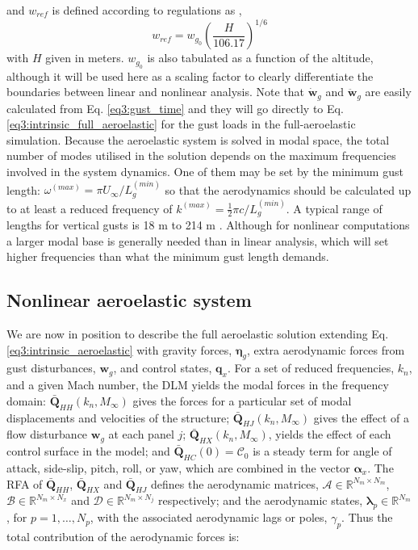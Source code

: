 \documentclass[11pt]{article}
\begin{document}
and $w_{ref}$ is defined according to regulations as \cite{Wright2007},
\begin{equation}\label{eq3:gust_scale}
w_{ref} = w_{g_0}\left(\frac{H}{106.17}\right)^{1/6}
\end{equation}
with $H$ given in meters. $w_{g_0}$ is also tabulated as a function of the altitude, although it will be used here as a scaling factor to clearly differentiate the boundaries between linear and nonlinear analysis. Note that $\dot{\bm{w}}_g$ and $\ddot{\bm{w}}_g$ are easily calculated from Eq. \eqref{eq3:gust_time} and they will go directly to Eq. \eqref{eq3:intrinsic_full_aeroelastic} for the gust loads in the full-aeroelastic simulation. Because the aeroelastic system is solved in modal space, the total number of modes utilised in the solution depends on the maximum frequencies involved in the system dynamics.  One of them may be set by  the minimum gust length: $\omega^{(max)} = \pi U_{\infty}/L_g^{(min)}$  so that the aerodynamics should be calculated up to at least a reduced frequency of $k^{(max)} = \tfrac12 \pi c/L_{g}^{(min)}$. A typical range of lengths for vertical gusts is 18 m to 214 m \cite{Wright2007}. Although for nonlinear computations a larger modal base is generally needed than in linear analysis, which will set higher frequencies than what the minimum gust length demands. 


\subsection{Nonlinear aeroelastic system}
\label{sec:orgf3f3512}

We are now in position to describe the full aeroelastic solution extending Eq.  \eqref{eq3:intrinsic_aeroelastic} with gravity forces, $\bm{\eta}_g$, extra aerodynamic forces from gust disturbances, $\bm{w}_g$, and control states, $\bm{q}_x$. For a set of reduced frequencies, $k_n$, and a given Mach number, the DLM yields  the modal forces in the frequency domain: $\bar{\bm{Q}}_{HH}(k_n,M_\infty)$ gives the forces for a particular set of modal displacements and velocities of the structure;  $\bar{\bm{Q}}_{HJ}(k_n,M_\infty)$ gives the effect of a flow disturbance $\bm{w}_g$ at each panel $j$; $\bar{\bm{Q}}_{HX}(k_n,M_\infty)$, yields the effect of each control surface in the model; and $\bar{\bm{Q}}_{HC}(0) = \pmb{\mathcal{C}}_0$ is a steady term for angle of attack, side-slip, pitch, roll, or yaw, which are combined in the vector $\bm{\alpha}_x$. The RFA of $\bar{\bm{Q}}_{HH}$, $\bar{\bm{Q}}_{HX}$ and $\bar{\bm{Q}}_{HJ}$  defines the aerodynamic matrices, $\pmb{\mathcal{A}} \in\mathbb{R}^{N_m\times N_m}$, $\pmb{\mathcal{B}} \in\mathbb{R}^{N_m\times N_x}$ and $\pmb{\mathcal{D}} \in\mathbb{R}^{N_m\times N_j}$ respectively; and the aerodynamic states,  $\pmb{\lambda}_p\in\mathbb{R}^{N_m}$, for $p=1,\ldots,N_p$, with the associated aerodynamic lags or poles,  $\gamma_p$. Thus the total contribution of the aerodynamic  forces is:
\end{document}
